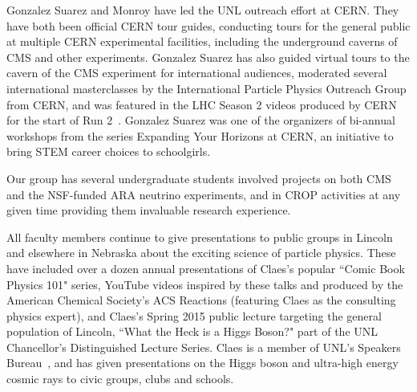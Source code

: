 Gonzalez Suarez and Monroy have led the UNL outreach effort at CERN. They have both been official CERN tour guides, conducting tours for the general public at multiple CERN experimental facilities, including the underground caverns of CMS and other experiments. Gonzalez Suarez has also guided virtual tours to the cavern of the CMS experiment for international audiences, moderated several international masterclasses by the International Particle Physics Outreach Group from CERN, and was featured in the LHC Season 2 videos produced by CERN for the start of Run 2~\cite{bib:LHCSeason2}. Gonzalez Suarez was one of the organizers of bi-annual workshops from the series Expanding Your Horizons at CERN, an initiative to bring STEM career choices to schoolgirls. 


Our group has several undergraduate students involved
projects on both CMS and the NSF-funded ARA neutrino experiments, and in CROP activities at any given time providing them invaluable research experience.


All faculty members continue to give presentations to public groups in Lincoln and elsewhere in Nebraska about the exciting science of particle physics. These have included over a dozen annual presentations of Claes's popular ``Comic Book Physics 101" series, YouTube videos inspired by these talks and produced by the American Chemical Society's ACS Reactions (featuring Claes as the consulting physics expert), and Claes's Spring 2015 public lecture targeting the general population of Lincoln, ``What the Heck is a Higgs Boson?" part of the UNL Chancellor's Distinguished Lecture Series.  
%
%
Claes is a member of UNL's Speakers Bureau~\cite{bib:speakers}, and has given presentations on the Higgs boson and ultra-high energy cosmic rays to civic groups, clubs and schools.